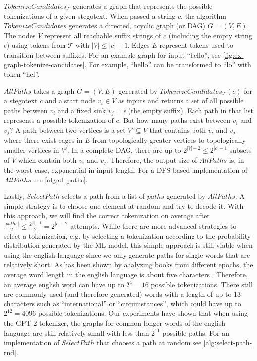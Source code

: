 $TokenizeCandidates_{\mathcal{T}}$ generates a graph that represents the possible tokenizations of a given stegotext.
When passed a string $c$, the algorithm $TokenizeCandidates$ generates a directed, acyclic graph (or DAG) $G = (V, E)$.
The nodes $V$ represent all reachable suffix strings of $c$ (including the empty string $\epsilon$) using tokens from $\mathcal{T}$ with $|V| \leq |c| + 1$.
Edges $E$ represent tokens used to transition between suffixes.
For an example graph for input ``hello'', see \autoref{fig:ex-graph-tokenize-candidates}.
For example, ``hello'' can be transformed to ``lo'' with token ``hel''.

$AllPaths$ takes a graph $G = (V, E)$ generated by $TokenizeCandidates_{\mathcal{T}}(c)$ for a stegotext $c$ and a start node $v_i \in V$ as inputs and returns a set of all possible paths between $v_i$ and a fixed sink $v_j = \epsilon$ (the empty suffix).
Each path in that list represents a possible tokenization of $c$.
But how many paths exist between $v_i$ and $v_j$?
A path between two vertices is a set $V' \subseteq V$ that contains both $v_i$ and $v_j$ where there exist edges in $E$ from topologically greater vertices to topologically smaller vertices in $V'$.
In a complete DAG, there are up to $2^{|V|-2} \leq 2^{|c|-1}$ subsets of $V$ which contain both $v_i$ and $v_j$.
Therefore, the output size of $AllPaths$ is, in the worst case, exponential in input length.
For a DFS-based implementation of $AllPaths$ see \autoref{alg:all-paths}.

Lastly, $SelectPath$ selects a path from a list of $paths$ generated by $AllPaths$.
A simple strategy is to choose one element at random and try to decode it.
With this approach, we will find the correct tokenization on average after $\frac{|paths|}{2} \leq \frac{2^{|c|-1}}{2} = 2^{|c|-2}$ attempts.
While there are more advanced strategies to select a tokenization, e.g. by selecting a tokenization according to the probability distribution generated by the ML model, this simple approach is still viable when using the english language since we only generate paths for single words that are relatively short.
As has been shown by analyzing books from different epochs, the average word length in the english language is about five characters \cite{BoShSo2012}.
Therefore, an average english word can have up to $2^4 = 16$ possible tokenizations.
There still are commonly used (and therefore generated) words with a length of up to 13 characters such as ``international'' or ``circumstances'', which could have up to $2^{12} = 4096$ possible tokenizations.
Our experiments have shown that when using the GPT-2 tokenizer, the graphs for common longer words of the english language are still relatively small with less than $2^{11}$ possible paths.
For an implementation of $SelectPath$ that chooses a path at random see \autoref{alg:select-path-rnd}.



